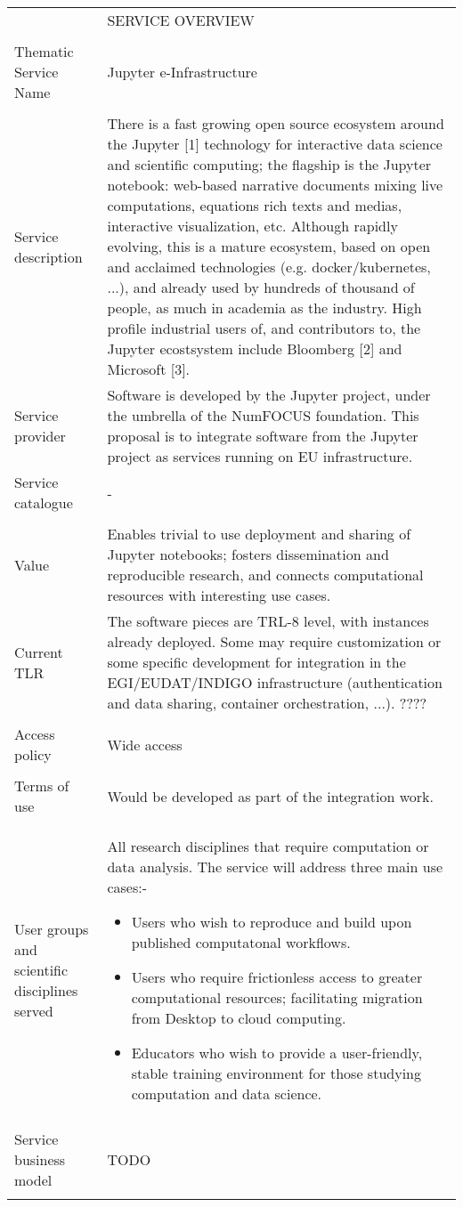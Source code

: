 \begin{tabular}{|p{5cm}|p{9cm}|}
\hline
 & SERVICE OVERVIEW\\
\\\hline
Thematic Service Name&Jupyter e-Infrastructure\\
\\\hline
Service description&There is a fast growing open source ecosystem around the
Jupyter [1] technology for interactive data science and scientific computing;
the flagship is the Jupyter notebook: web-based narrative documents mixing live
computations, equations rich texts and medias, interactive visualization, etc.
Although rapidly evolving, this is a mature ecosystem, based on open
and acclaimed technologies (e.g. docker/kubernetes, ...), and already used
by hundreds of thousand of people, as much in academia as the industry.
High profile industrial users of, and contributors to, the Jupyter ecostsystem
include Bloomberg [2] and Microsoft [3].
\\\hline
Service provider&Software is developed by the Jupyter project, under the
umbrella of the NumFOCUS foundation. This proposal is to integrate software from
the Jupyter project as services running on EU infrastructure.
\\\hline
Service catalogue&-\\
\\\hline
Value&Enables trivial to use deployment and sharing of
Jupyter notebooks; fosters dissemination and reproducible research,
and connects computational resources with interesting use cases.
\\\hline
Current TLR&The software pieces
are TRL-8 level, with instances already deployed. Some may require
customization or some specific development for integration in the
EGI/EUDAT/INDIGO infrastructure (authentication and data sharing,
container orchestration, ...).  ????\\
\\\hline
Access policy&Wide access\\
\\\hline
Terms of use&Would be developed as part of the integration work.
\\\hline
User groups and scientific disciplines served&All research
disciplines that require computation or data analysis. The service
will address three main use cases:-
\begin{itemize}
\item Users who wish to reproduce and build upon published
  computatonal workflows.
\item Users who require frictionless access to greater computational
  resources; facilitating migration from Desktop to cloud computing.
\item Educators who wish to provide a user-friendly, stable training
  environment for those studying computation and data science.
\end{itemize}\\
\\\hline
Service business model&TODO\\
\\\hline
\end{tabular}


